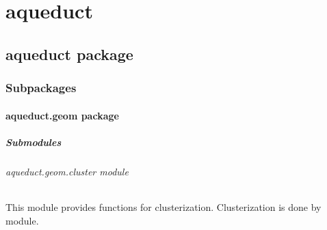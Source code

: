 \documentclass[a4paper,10pt,english]{sphinxmanual}
\begin{document}
\chapter{aqueduct}
\label{modules:aqueduct}\label{modules::doc}

\section{aqueduct package}
\label{aqueduct::doc}\label{aqueduct:aqueduct-package}

\subsection{Subpackages}
\label{aqueduct:subpackages}

\subsubsection{aqueduct.geom package}
\label{aqueduct.geom::doc}\label{aqueduct.geom:aqueduct-geom-package}

\paragraph{Submodules}
\label{aqueduct.geom:submodules}

\subparagraph{aqueduct.geom.cluster module}
\label{aqueduct.geom.cluster:module-aqueduct.geom.cluster}\label{aqueduct.geom.cluster::doc}\label{aqueduct.geom.cluster:aqueduct-geom-cluster-module}
This module provides functions for clusterization.
Clusterization is done by  module.

\begin{fulllineitems}
\label{aqueduct.geom.cluster:aqueduct.geom.cluster.MeanShiftBandwidth}
\end{fulllineitems}

\end{document}
